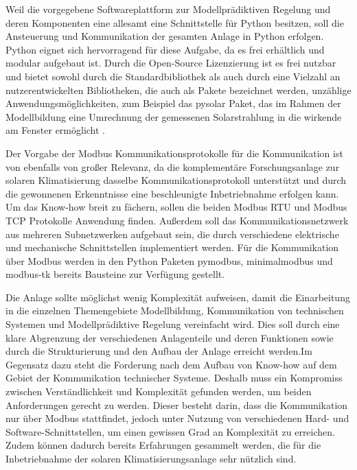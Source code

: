 
Weil die vorgegebene Softwareplattform zur Modellprädiktiven Regelung und deren Komponenten eine allesamt eine Schnittstelle für Python besitzen, soll die Ansteuerung und Kommunikation der gesamten Anlage in Python erfolgen. Python eignet sich hervorragend für diese Aufgabe, da es frei erhältlich und modular aufgebaut ist. Durch die Open-Source Lizenzierung ist es frei nutzbar und bietet sowohl durch die Standardbibliothek als auch durch eine Vielzahl an nutzerentwickelten Bibliotheken, die auch als Pakete bezeichnet werden, unzählige Anwendungsmöglichkeiten, zum Beispiel das pysolar Paket, das im Rahmen der Modellbildung eine Umrechnung der gemessenen Solarstrahlung in die wirkende am Fenster ermöglicht \cite[S.~2f.]{python}.

Der Vorgabe der Modbus Kommunikationsprotokolle für die Kommunikation ist von ebenfalls von großer Relevanz, da die komplementäre Forschungsanlage zur solaren Klimatisierung dasselbe Kommunikationsprotokoll unterstützt und durch die gewonnenen Erkenntnisse eine beschleunigte Inbetriebnahme erfolgen kann. Um das Know-how breit zu fächern, sollen die beiden Modbus RTU und Modbus TCP Protokolle Anwendung finden. Außerdem soll das Kommunikationsnetzwerk aus mehreren Subnetzwerken aufgebaut sein, die durch verschiedene elektrische und mechanische Schnittstellen implementiert werden. Für die Kommunikation über Modbus werden in den Python Paketen pymodbus, minimalmodbus und modbus-tk bereits Bausteine zur Verfügung gestellt.

Die Anlage sollte möglichst wenig Komplexität aufweisen, damit die Einarbeitung in die einzelnen Themengebiete Modellbildung, Kommunikation von technischen Systemen und Modellprädiktive Regelung vereinfacht wird. Dies soll durch eine klare Abgrenzung der verschiedenen Anlagenteile und deren Funktionen sowie durch die Strukturierung und den Aufbau der Anlage erreicht werden.Im Gegensatz dazu steht die Forderung nach dem Aufbau von Know-how auf dem Gebiet der Kommunikation technischer Systeme. Deshalb muss ein Kompromiss zwischen Verständlichkeit und Komplexität gefunden werden, um beiden Anforderungen gerecht zu werden. Dieser besteht darin, dass die Kommunikation nur über Modbus stattfindet, jedoch unter Nutzung von verschiedenen Hard- und Software-Schnittstellen, um einen gewissen Grad an Komplexität zu erreichen. Zudem können dadurch bereits Erfahrungen gesammelt werden, die für die Inbetriebnahme der solaren Klimatisierungsanlage sehr nützlich sind. 

